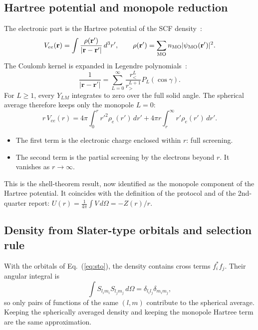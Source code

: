 \documentclass[11pt,a4paper]{article}
\newcommand{\br}{\mathbf r}
\begin{document}
\subsection{Hartree potential and monopole reduction}
The electronic part is the Hartree potential of the SCF density~\cite{Szabo1996,Hartree1928}:
\begin{equation}
V_{ee}(\br)=\int\frac{\rho(\br')}{|\br-\br'|}\,d^3r',\qquad
\rho(\br')=\sum_{\rm MO}n_{\rm MO}|\psi_{\rm MO}(\br')|^2 .
\end{equation}
The Coulomb kernel is expanded in Legendre polynomials~\cite{Jackson1998}:
\begin{equation}
\frac1{|\br-\br'|}=\sum_{L=0}^\infty\frac{r_<^L}{r_>^{L+1}}P_L(\cos\gamma).
\end{equation}
For $L\ge1$, every $Y_{LM}$ integrates to zero over the full solid angle. The spherical average
therefore keeps only the monopole $L=0$:
\begin{equation}
r\,V_{ee}(r)=4\pi\int_0^r r'^2\rho_e(r')\,dr'+4\pi r\int_r^\infty r'\rho_e(r')\,dr' .
\end{equation}
\begin{itemize}
\item The first term is the electronic charge enclosed within $r$: full screening.
\item The second term is the partial screening by the electrons beyond $r$. It vanishes as
  $r\to\infty$.
\end{itemize}
This is the shell-theorem result, now identified as the monopole component of the Hartree
potential. It coincides with the definition of the protocol and of the 2nd-quarter report:
$U(r)=\frac1{4\pi}\int V\,d\Omega=-Z(r)/r$.

\subsection{Density from Slater-type orbitals and selection rule}
With the orbitals of Eq.~(\ref{eq:sto}), the density contains cross terms $f_i^*f_j$. Their
angular integral is
\begin{equation}
\int S_{l_im_i}S_{l_jm_j}\,d\Omega=\delta_{l_il_j}\delta_{m_im_j},
\end{equation}
so only pairs of functions of the same $(l,m)$ contribute to the spherical average. Keeping the
spherically averaged density and keeping the monopole Hartree term are the same approximation.
\end{document}
